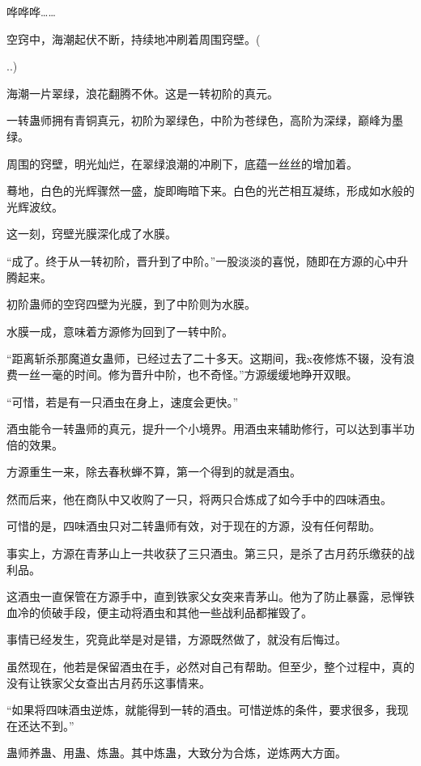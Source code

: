 
\begin{this_body}

哗哗哗……

空窍中，海潮起伏不断，持续地冲刷着周围窍壁。(

..)

海潮一片翠绿，浪花翻腾不休。这是一转初阶的真元。

一转蛊师拥有青铜真元，初阶为翠绿色，中阶为苍绿色，高阶为深绿，巅峰为墨绿。

周围的窍壁，明光灿烂，在翠绿浪潮的冲刷下，底蕴一丝丝的增加着。

蓦地，白色的光辉骤然一盛，旋即晦暗下来。白色的光芒相互凝练，形成如水般的光辉波纹。

这一刻，窍壁光膜深化成了水膜。

“成了。终于从一转初阶，晋升到了中阶。”一股淡淡的喜悦，随即在方源的心中升腾起来。

初阶蛊师的空窍四壁为光膜，到了中阶则为水膜。

水膜一成，意味着方源修为回到了一转中阶。

“距离斩杀那魔道女蛊师，已经过去了二十多天。这期间，我x夜修炼不辍，没有浪费一丝一毫的时间。修为晋升中阶，也不奇怪。”方源缓缓地睁开双眼。

“可惜，若是有一只酒虫在身上，速度会更快。”

酒虫能令一转蛊师的真元，提升一个小境界。用酒虫来辅助修行，可以达到事半功倍的效果。

方源重生一来，除去春秋蝉不算，第一个得到的就是酒虫。

然而后来，他在商队中又收购了一只，将两只合炼成了如今手中的四味酒虫。

可惜的是，四味酒虫只对二转蛊师有效，对于现在的方源，没有任何帮助。

事实上，方源在青茅山上一共收获了三只酒虫。第三只，是杀了古月药乐缴获的战利品。

这酒虫一直保管在方源手中，直到铁家父女突来青茅山。他为了防止暴露，忌惮铁血冷的侦破手段，便主动将酒虫和其他一些战利品都摧毁了。

事情已经发生，究竟此举是对是错，方源既然做了，就没有后悔过。

虽然现在，他若是保留酒虫在手，必然对自己有帮助。但至少，整个过程中，真的没有让铁家父女查出古月药乐这事情来。

“如果将四味酒虫逆炼，就能得到一转的酒虫。可惜逆炼的条件，要求很多，我现在还达不到。”

蛊师养蛊、用蛊、炼蛊。其中炼蛊，大致分为合炼，逆炼两大方面。


\end{this_body}
